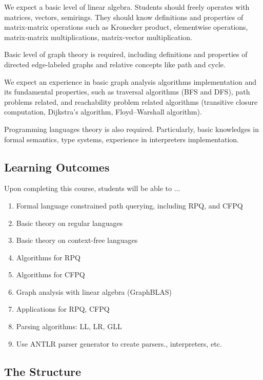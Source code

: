 \documentclass[sigconf]{acmart}
\begin{document}
We expect a basic level of linear algebra.
Students should freely operates with matrices, vectors, semirings.
They should know definitions and properties of matrix-matrix operations such as Kronecker product, elementwise operations, matrix-matrix multiplications, matrix-vector multiplication. 

Basic level of graph theory is required, including definitions and properties of directed edge-labeled graphs and relative concepts like path and cycle.

We expect an experience in basic graph analysis algorithms implementation and its fundamental properties, such as traversal algorithms (BFS and DFS), path problems related, and reachability problem related algorithms (transitive closure computation, Dijkstra's algorithm, Floyd–Warshall algorithm).

Programming languages theory is also required. Particularly, basic knowledges in formal semantics, type systems, experience in interpreters implementation.

\subsection{Learning Outcomes}

Upon completing this course, students will be able to ...

\begin{enumerate}
  \item Formal language constrained path querying, including RPQ, and CFPQ
  \item Basic theory on regular languages
  \item Basic theory on context-free languages
  \item Algorithms for RPQ
  \item Algorithms for CFPQ
  \item Graph analysis with linear algebra (GraphBLAS)
  \item Applications for RPQ, CFPQ
  \item Parsing algorithms: LL, LR, GLL
  \item Use ANTLR parser generator to create parsers., interpreters, etc.
\end{enumerate}

\subsection{The Structure}
\end{document}
